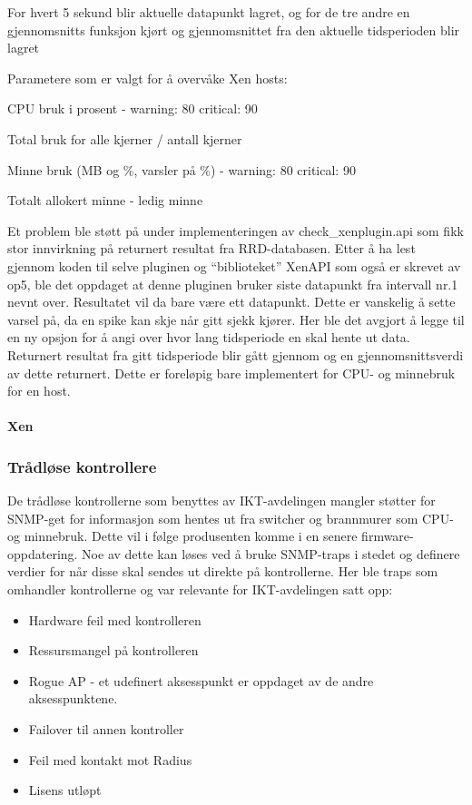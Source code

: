 For hvert 5 sekund blir aktuelle datapunkt lagret, og for de tre andre en gjennomsnitts funksjon kjørt og gjennomsnittet fra den aktuelle tidsperioden blir lagret 

Parametere som er valgt for å overvåke Xen hosts:

CPU bruk i prosent - warning: 80 critical: 90 

Total bruk for alle kjerner / antall kjerner

Minne bruk (MB og \%, varsler på \%) - warning: 80 critical: 90

Totalt allokert minne - ledig minne 

Et problem ble støtt på under implementeringen av check\_xenplugin.api som fikk stor innvirkning på returnert resultat fra RRD-databasen. Etter å ha lest gjennom koden til selve pluginen og “biblioteket” XenAPI som også er skrevet av op5, ble det oppdaget at denne pluginen bruker siste datapunkt fra intervall nr.1 nevnt over. Resultatet vil da bare være ett datapunkt. Dette er vanskelig å sette varsel på, da en spike kan skje når gitt sjekk kjører. Her ble det avgjort å legge til en ny opsjon for å angi over hvor lang tidsperiode en skal hente ut data. Returnert resultat fra gitt tidsperiode blir gått gjennom og en gjennomsnittsverdi av dette returnert. Dette er foreløpig bare implementert for CPU- og minnebruk for en host.

\paragraph{Xen}


\subsubsection{Trådløse kontrollere}

De trådløse kontrollerne som benyttes av IKT-avdelingen mangler støtter for SNMP-get for informasjon som hentes ut fra switcher og brannmurer som  CPU- og minnebruk. Dette vil i følge produsenten komme i en senere firmware-oppdatering.
Noe av dette kan løses ved å bruke SNMP-traps i stedet og definere verdier for når disse skal sendes ut direkte på kontrollerne. Her ble traps som omhandler kontrollerne og var relevante for IKT-avdelingen satt opp:

\begin{itemize}
	\item Hardware feil med kontrolleren
	\item Ressursmangel på kontrolleren
	\item Rogue AP - et udefinert aksesspunkt er oppdaget av de andre aksesspunktene.
	\item Failover til annen kontroller
	\item Feil med kontakt mot Radius
	\item Lisens utløpt
\end{itemize}

